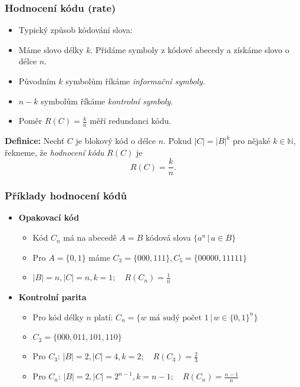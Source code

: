\documentclass{beamer}
\newenvironment{definice}{\textbf{Definice:} }{}
\newcommand{\sep}{\,|\,}
\newenvironment{itemizex}%
  {\large \begin{itemize}%
    \setlength{\itemsep}{8pt}%
    \setlength{\parskip}{8pt}}%
  {\end{itemize}}
\newenvironment{itemize4}%
  {\large \begin{itemize}%
    \setlength{\itemsep}{4pt}%
    \setlength{\parskip}{4pt}}%
  {\end{itemize}}
\newenvironment{itemizey}%
  {\large \begin{itemize}%
    \setlength{\itemsep}{6pt}%
    \setlength{\parskip}{6pt}}%
  {\end{itemize}}
\begin{document}
\begin{frame}[t,fragile]\frametitle{Hodnocení kódu (rate)} 
    \begin{itemizey}
        \item Typický způsob kódování slova:
        \item Máme slovo délky $k$. Přidáme symboly z kódové abecedy a získáme slovo o délce $n$.
        \item Původním $k$ symbolům říkáme \textit{informační symboly}.
        \item $n-k$ symbolům říkáme \textit{kontrolní symboly}.
        \item Poměr $R(C)=\frac{k}{n}$ měří redundanci kódu.
    \end{itemizey}

    \begin{definice}
    Nechť $C$ je blokový kód o délce $n$. Pokud $|C|=|B|^k$ pro nějaké $k\in\mathbb{N}$, řekneme, že \textit{hodnocení kódu} $R(C)$ je
    $$
    R(C) = \frac{k}{n}.
    $$
    \end{definice}
\end{frame}


\begin{frame}[t,fragile]\frametitle{Příklady hodnocení kódů} 
    \begin{itemizex}
        \item \textbf{Opakovací kód}
        \begin{itemize4}
            \item Kód $C_n$ má na abecedě $A=B$ kódová slova $\{a^n\sep a\in B\}$
            \item Pro $A=\{0,1\}$ máme $C_3=\{000,111\}, C_5=\{00000,11111\}$
            \item $|B|=n, |C|=n, k=1;\quad R(C_n)=\frac{1}{n}$
        \end{itemize4}
        \item \textbf{Kontrolní parita}
        \begin{itemize4}
            \item Pro kód délky $n$ platí: $C_n=\{w \mbox{ má sudý počet 1}\sep w\in \{0,1\}^n\}$
            \item $C_3=\{000,011,101,110\}$
            \item Pro $C_3$: $|B|=2, |C|=4, k=2;\quad R(C_3)=\frac23$
            \item Pro $C_n$: $|B|=2, |C|=2^{n-1}, k=n-1;\quad R(C_n)=\frac{n-1}{n}$
        \end{itemize4}
    \end{itemizex}
\end{frame}
\end{document}

